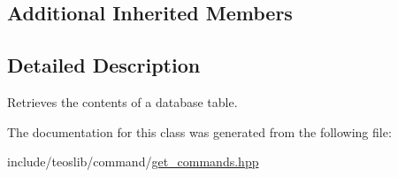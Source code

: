 \subsection*{Additional Inherited Members}


\subsection{Detailed Description}
Retrieves the contents of a database table. 

The documentation for this class was generated from the following file\+:\begin{DoxyCompactItemize}
\item 
include/teoslib/command/\mbox{\hyperlink{get__commands_8hpp}{get\+\_\+commands.\+hpp}}\end{DoxyCompactItemize}
